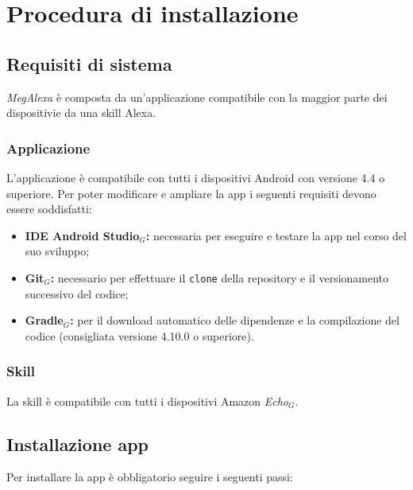 \chapter{Procedura di installazione}

\section{Requisiti di sistema}
\label{RequisitSistema}
\textit{MegAlexa} è composta da un'applicazione compatibile con la maggior parte dei dispositivie da una skill Alexa.
\subsection{Applicazione}
L'applicazione è compatibile con tutti i dispositivi Android con versione 4.4 o superiore.
Per poter modificare e ampliare la app i seguenti requisiti devono essere soddisfatti:
\begin{itemize}

	\item \textbf{IDE Android Studio$_{G}$:} necessaria per eseguire e testare la app nel corso del suo sviluppo;
	\item \textbf{Git$_{G}$:} necessario per effettuare il \texttt{clone} della repository e il versionamento successivo del codice;
	\item \textbf{Gradle$_{G}$:} per il download automatico delle dipendenze e la compilazione del codice (consigliata versione 4.10.0 o superiore).

\end{itemize}


\subsection{Skill}
La skill è compatibile con tutti i dispositivi Amazon \textit{Echo$_{G}$}.

\section{Installazione app} \label{installazioneApp}
Per installare la app è obbligatorio seguire i seguenti passi:

